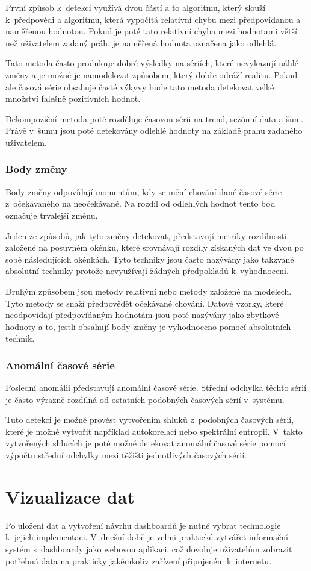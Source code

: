 První způsob k~detekci využívá dvou částí a to algoritmu, který slouží k~předpovědi a algoritmu, která vypočítá relativní chybu mezi předpovídanou a naměřenou hodnotou. Pokud je poté tato relativní chyba mezi hodnotami větší než uživatelem zadaný práh, je naměřená hodnota označena jako odlehlá. 

Tato metoda často produkuje dobré výsledky na sériích, které nevykazují náhlé změny a je možné je namodelovat způsobem, který dobře odráží realitu. Pokud ale časová série obsahuje časté výkyvy bude tato metoda detekovat velké množství falešně pozitivních hodnot.

Dekompoziční metoda poté rozděluje časovou sérii na trend, sezónní data a šum. Právě v~šumu jsou poté detekovány odlehlé hodnoty na základě prahu zadaného uživatelem.
\subsection*{Body změny}
Body změny odpovídají momentům, kdy se mění chování dané časové série z~očekávaného na neočekávané. Na rozdíl od odlehlých hodnot tento bod označuje trvalejší změnu.

Jeden ze způsobů, jak tyto změny detekovat, představují metriky rozdílnosti založené na posuvném okénku, které srovnávají rozdíly získaných dat ve dvou po sobě následujících okénkách. Tyto techniky jsou často nazývány jako takzvané absolutní techniky protože nevyužívají žádných předpokladů k~vyhodnocení.

Druhým způsobem jsou metody relativní nebo metody založené na modelech. Tyto metody se snaží předpovědět očekávané chování.  Datové vzorky, které neodpovídají předpovídaným hodnotám jsou poté nazývány jako zbytkové hodnoty a to, jestli obsahují body změny je vyhodnoceno pomocí absolutních technik.
\subsection*{Anomální časové série}
Poslední anomálii představují anomální časové série. Střední odchylka těchto sérií je často výrazně rozdílná od ostatních podobných časových sérií v~systému. 

Tuto detekci je možné provést vytvořením shluků z~podobných časových sérií, které je možné vytvořit například autokorelací nebo spektrální entropií. V~takto vytvořených shlucích je poté možné detekovat anomální časové série pomocí výpočtu střední odchylky mezi těžišti jednotlivých časových sérií.

\chapter{Vizualizace dat}
\label{chapter_visualisation}
Po uložení dat a vytvoření návrhu dashboardů je nutné vybrat technologie k~jejich implementaci. V~dnešní době je velmi praktické vytvářet informační systém s~dashboardy jako webovou aplikaci, což dovoluje uživatelům zobrazit potřebná data na prakticky jakémkoliv zařízení připojeném k~internetu. 

